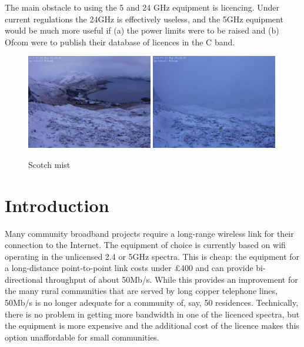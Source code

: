 \documentclass{amsart}
\begin{document}
The main obstacle to using the 5 and 24 GHz equipment is licencing.
Under current regulations the 24GHz is effectively useless, and the 5GHz
equipment would be much more useful if (a)  the power limits were to
be raised and (b) Ofcom were to publish their database of licences in
the C band.

\begin{figure}
  \begin{center}
    \includegraphics[width=0.49\textwidth]{sgritheall-clear.jpg}%
    \hfill%
    \includegraphics[width=0.49\textwidth]{sgritheall-cloudy.jpg}
  \end{center}
\label{fig-cloudy}
\caption{Scotch mist}
\end{figure}
\section{Introduction}\label{introduction}
Many community broadband projects require a long-range wireless link
for their connection to the Internet. The equipment of choice is
currently based on wifi operating in the unlicensed 2.4 or 5GHz
spectra. This is cheap: the equipment for a long-distance
point-to-point link costs under \pounds 400 and can provide
bi-directional throughput of about 50Mb/s. While this provides an
improvement for the many rural communities that are served by long
copper telephone lines, 50Mb/s is no longer adequate for a community
of, say, 50 residences. Technically, there is no problem in getting
more bandwidth in one of the licenced spectra, but the equipment is
more expensive and the additional cost of the licence makes this
option unaffordable for small communities.
\end{document}
